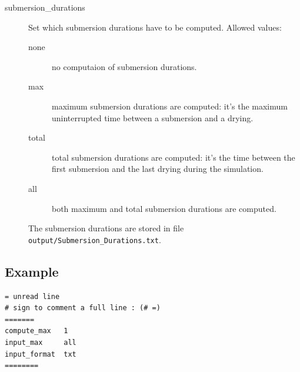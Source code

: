 \begin{description}
\item[submersion\_durations]  Set which submersion durations have to be computed. Allowed values:
\begin{description}
\item[none] no computaion of submersion durations.
\item[max] maximum submersion durations are computed: it's the maximum uninterrupted time between a submersion and a drying.
\item[total] total submersion durations are computed: it's the time between the first submersion and the last drying during the simulation.
\item[all] both maximum and total submersion durations are computed.
\end{description}
The submersion durations are stored in file \texttt{output/Submersion\_Durations.txt}.

\end{description}

\subsection{Example}
\begin{verbatim}
= unread line
# sign to comment a full line : (# =)
=======
compute_max   1
input_max     all
input_format  txt
========
\end{verbatim}
